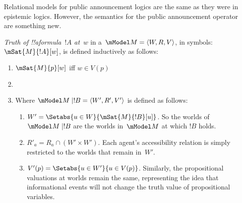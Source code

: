 \documentclass[../../../include/open-logic-section]{subfiles}
\begin{document}


Relational models for public announcement logics are the same as they
were in epistemic logics. However, the semantics for the public
announcement operator are something new.

\begin{defn} \emph{Truth of !!a{formula}~$!A$
  at~$w$} in a~$\mModel M = \langle W, R, V \rangle$, in symbols:
  $\mSat{M}{!A}[w]$, is defined inductively as follows:
  \begin{enumerate}
  \item $\mSat{M}{p}[w]$ iff $w \in V(p)$
  \item{}
  \item{}

  
  Where $\mModel M \mid !B = \langle W', R', V' \rangle$ is defined as follows:
  \begin{enumerate}
  \item $W' = \Setabs{ u \in W}{\mSat{M}{!B}[u]}$. So the worlds of
  $\mModel M \mid !B$ are the worlds in~$\mModel M$ at which $!B$
  holds.
  \item $R'_a = R_a \cap (W' \times W')$. Each agent's accessibility
  relation is simply restricted to the worlds that remain in~$W'$.
  \item $V'(p) = \Setabs{ u \in W'}{u \in V(p) }$. Similarly, the
  propositional valuations at worlds remain the same, representing the
  idea that informational events will not change the truth value of
  propositional variables.
  \end{enumerate}
  
  \end{enumerate} 
\end{defn}
\end{document}
